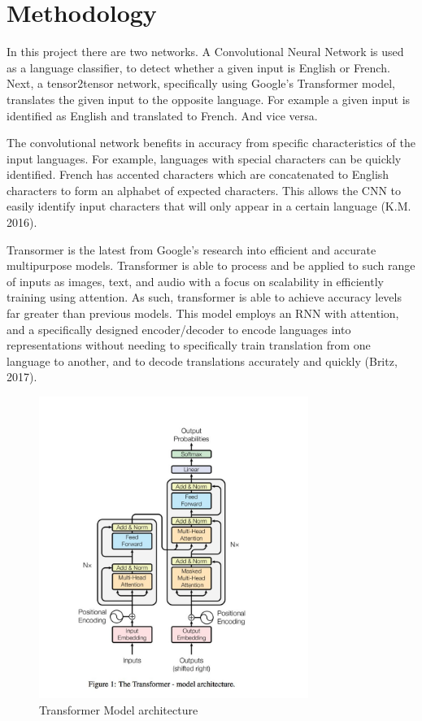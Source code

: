 \documentclass[10pt,a4paper]{article}
\begin{document}
\clearpage


\section{Methodology}

  In this project there are two networks. A Convolutional Neural Network is used as a language classifier, to detect whether a given input is English or French. Next, a tensor2tensor network, specifically using Google's Transformer model, translates the given input to the opposite language. For example a given input is identified as English and translated to French. And vice versa.
  
  
  The convolutional network benefits in accuracy from specific characteristics of the input languages. For example, languages with special characters can be quickly identified. French has accented characters which are concatenated to English characters to form an alphabet of expected characters. This allows the CNN to easily identify input characters that will only appear in a certain language (K.M. 2016).
  
  
  Transormer is the latest from Google's research into efficient and accurate multipurpose models. Transformer is able to process and be applied to such range of inputs as images, text, and audio with a focus on scalability in efficiently training using attention. As such, transformer is able to achieve accuracy levels far greater than previous models. This model employs an RNN with attention, and a specifically designed encoder/decoder to encode languages into representations without needing to specifically train translation from one language to another, and to decode translations accurately and quickly (Britz, 2017).
   
   
\begin{figure}[H]
  \begin{center}
    \includegraphics[width=0.78\textwidth] {transformer.jpg}
    \caption{Transformer Model architecture}
  \end{center}
\end{figure}
\end{document}
